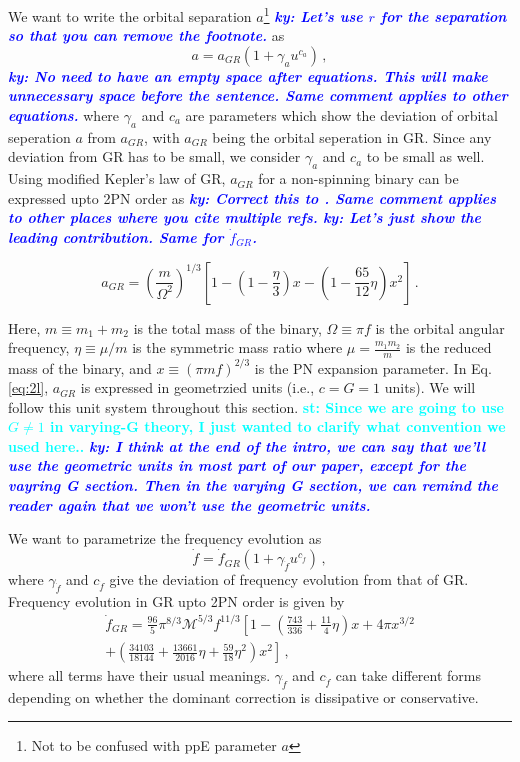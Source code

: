 \documentclass[11pt]{article}
\newcommand{\ky}[1]{\textcolor{blue}{\it{\textbf{ky: #1}}} }
\newcommand{\st}[1]{\textcolor{cyan}{\textbf{st: #1}} }
\begin{document}
 \hspace*{15.5pt}We want to write the orbital separation $a$\footnote{Not to be confused with ppE parameter $a$} \ky{Let's use $r$ for the separation so that you can remove the footnote.} as
 \begin{equation}
 \label{eq:2k}
 a=a_{GR}(1+\gamma_a u^{c_a})\,,
 \end{equation}
\ky{No need to have an empty space after equations. This will make unnecessary space before the sentence. Same comment applies to other equations.}
 where $\gamma_a$ and $c_a$ are parameters which show the deviation of orbital seperation $a$ from $a_{GR}$, with $a_{GR}$ being the orbital seperation in GR. Since any deviation from GR has to be small, we consider $\gamma_a$ and $c_a$ to be small as well. Using modified Kepler's law of GR, $a_{GR}$ for a non-spinning binary can be expressed upto 2PN order as \cite{Blanchet:1995ez} \cite{Blanchet:2013haa} \ky{Correct this to \cite{Blanchet:1995ez,Blanchet:2013haa}. Same comment applies to other places where you cite multiple refs. } \ky{Let's just show the leading contribution. Same for $\dot f_{GR}$.}
 
 \begin{equation}\label{eq:2l}
 a_{GR}=\left(\frac{m}{\Omega^2}\right)^{1/3}\left[1-\left(1-\frac{\eta}{3}\right)x-\left(1-\frac{65}{12}\eta\right)x^2\right]\,.
 \end{equation}
 
 Here, $m\equiv m_1+m_2$ is the total mass of the binary, $\Omega\equiv\pi f $ is the orbital angular frequency, $\eta\equiv\mu/m$ is the symmetric mass ratio where $\mu=\frac{m_1m_2}{m}$ is the reduced mass of the binary, and $x\equiv (\pi m f)^{2/3}$ is the PN expansion parameter. In Eq. \eqref{eq:2l}, $a_{GR}$ is expressed in geometrzied units (i.e., $c=G=1$ units). We will follow this unit system throughout this section. \st{Since we are going to use $G\neq 1$ in varying-G theory, I just wanted to clarify what convention we used here..}
 \ky{I think at the end of the intro, we can say that we'll use the geometric units in most part of our paper, except for the vayring G section. Then in the varying G section, we can remind the reader again that we won't use the geometric units.}
 
 We want to parametrize the frequency evolution as
\begin{equation}\label{eq:2m}
\dot{f}=\dot{f}_{GR}\left(1+\gamma_{\dot{f}}u^{c_{\dot{f}}}\right)\,,
\end{equation}
where $\gamma_{\dot{f}}$ and $c_{\dot{f}}$ give the deviation of frequency evolution from that of GR. Frequency evolution in GR upto 2PN order is given by \cite{Blanchet:1995ez}
\begin{align}
\dot{f}_{GR}=\frac{96}{5}\pi^{8/3}\mathcal{M}^{5/3}f^{11/3}\left[1-\left(\frac{743}{336}+\frac{11}{4}\eta\right)x+4\pi x^{3/2}\right. \nonumber\\ \left. +\left(\frac{34103}{18144}+\frac{13661}{2016}\eta+\frac{59}{18}\eta^2\right)x^2 \right]\,,
\end{align}
where all terms have their usual meanings. $\gamma_{\dot{f}}$ and $c_{\dot{f}}$ can take different forms depending on whether the dominant correction is dissipative or conservative.
 
\end{document}
